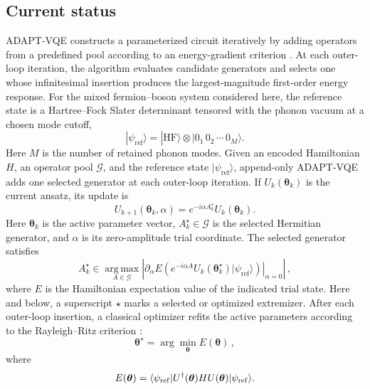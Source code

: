 \documentclass[
  reprint,
  amsmath,
  amssymb,
  aps,
  pra,
  nofootinbib,
  superscriptaddress,
  floatfix
]{revtex4-2}
\newcommand{\ket}[1]{|#1\rangle}
\newcommand{\bra}[1]{\langle #1|}
\begin{document}
\subsection{Current status}
ADAPT-VQE constructs a parameterized circuit iteratively by adding operators from a predefined pool according to an energy-gradient criterion \cite{Grimsley2019,Tang2021,Yordanov2021}.
At each outer-loop iteration, the algorithm evaluates candidate generators and selects one whose infinitesimal insertion produces the largest-magnitude first-order energy response. For the mixed fermion--boson system considered here, the reference state is a Hartree--Fock Slater determinant tensored with the phonon vacuum at a chosen mode cutoff,
\begin{equation*}
\ket{\psi_{\mathrm{ref}}}=\ket{\mathrm{HF}}\otimes\ket{0_1\,0_2\,\cdots\,0_M}.
\end{equation*}
Here \(M\) is the number of retained phonon modes. Given an encoded Hamiltonian \(H\), an operator pool \(\mathcal G\), and the reference state \(\ket{\psi_{\mathrm{ref}}}\), append-only ADAPT-VQE adds one selected generator at each outer-loop iteration. If \(U_k(\boldsymbol{\theta}_k)\) is the current ansatz, its update is
\begin{equation*}
U_{k+1}(\boldsymbol{\theta}_{k},\alpha)
=e^{-i\alpha A_k^\star}U_k(\boldsymbol{\theta}_{k}).
\end{equation*}
Here \(\boldsymbol{\theta}_k\) is the active parameter vector, \(A_k^\star\in\mathcal G\) is the selected Hermitian generator, and \(\alpha\) is its zero-amplitude trial coordinate. The selected generator satisfies
\begin{equation}
A_k^\star\in\operatorname*{arg\,max}_{A\in\mathcal G}
\left|
\left.
\partial_{\alpha}E\!\left(e^{-i\alpha A}U_k(\boldsymbol{\theta}_{k}^\star)\ket{\psi_{\mathrm{ref}}}\right)
\right|_{\alpha=0}
\right|\,,
\label{eq:adapt_append_gradient}
\end{equation}
where \(E\) is the Hamiltonian expectation value of the indicated trial state. Here and below, a superscript \(\star\) marks a selected or optimized extremizer. After each outer-loop insertion, a classical optimizer refits the active parameters according to the Rayleigh--Ritz criterion \cite{Peruzzo2014,McClean2016,Kandala2017}:
\begin{equation}
\label{eq:theta_opt}
\boldsymbol{\theta}^\star=\arg\min_{\boldsymbol{\theta}}E(\boldsymbol{\theta})\,,
\end{equation}
where \begin{equation}
E(\boldsymbol{\theta})=
\bra{\psi_{\rm ref}}U^\dagger(\boldsymbol{\theta})HU(\boldsymbol{\theta})\ket{\psi_{\rm ref}}.
\label{eq:rayleigh_static}
\end{equation}
\end{document}
